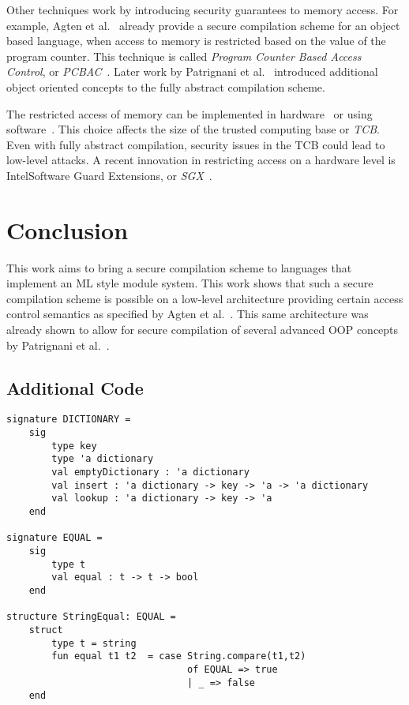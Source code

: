 \documentclass[11pt]{article}
\newcommand{\mypageref}[1]{Page~\pageref{#1}}
\newcommand{\earlier}[2]{{\protect\myref{#1}{#2}} on {\protect\mypageref{#2}}}
\begin{document}
Other techniques work by introducing security guarantees to memory access.
For example, Agten et al.~\cite{Agten:2012:SCM:2354412.2355247} already provide a secure compilation scheme for an object based language, when access to memory is restricted based on the value of the program counter. This technique is called \emph{Program Counter Based Access Control}, or \emph{PCBAC}~\cite{PCBAC}.
Later work by Patrignani et al.~\cite{Patrignani} introduced additional object oriented concepts to the fully abstract compilation scheme.

The restricted access of memory can be implemented in hardware~\cite{Sancus,SGX} or using software~\cite{Fides,Salus}.
This choice affects the size of the trusted computing base or \emph{TCB}.
Even with fully abstract compilation, security issues in the TCB could lead to low-level attacks.
A recent innovation in restricting access on a hardware level is Intel\textregistered Software Guard Extensions, or \emph{SGX}~\cite{SGX}.

\section{Conclusion}
This work aims to bring a secure compilation scheme to languages that implement an ML style module system.
This work shows that such a secure compilation scheme is possible on a low-level architecture providing certain access control semantics as specified by Agten et al.~\cite{Agten:2012:SCM:2354412.2355247}. 
This same architecture was already shown to allow for secure compilation of several advanced OOP concepts by Patrignani et al.~\cite{Patrignani}.

\clearpage
\begin{appendices}
\section{Additional Code}
\label{app:AdditionalCode}
\begin{lstlisting}[label={lst:AdditionalSignatures}, caption={The auxilary signatures and structures for the functor example of \earlier{lst}{lst:DictionaryFunctorExample}.}]
signature DICTIONARY =
    sig
        type key
        type 'a dictionary
        val emptyDictionary : 'a dictionary
        val insert : 'a dictionary -> key -> 'a -> 'a dictionary
        val lookup : 'a dictionary -> key -> 'a
    end

signature EQUAL =
    sig
        type t
        val equal : t -> t -> bool
    end

structure StringEqual: EQUAL = 
    struct
        type t = string
        fun equal t1 t2  = case String.compare(t1,t2)
                                of EQUAL => true
                                | _ => false
    end
\end{lstlisting}
\end{appendices}


\end{document}
